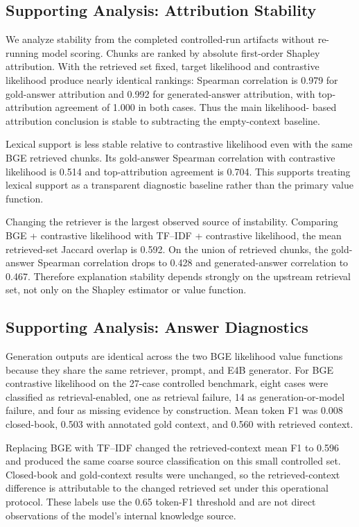 \documentclass[10pt]{article}
\begin{document}
\subsection{Supporting Analysis: Attribution Stability}
We analyze stability from the completed controlled-run artifacts without
re-running model scoring. Chunks are ranked by absolute first-order Shapley
attribution. With the retrieved set fixed, target likelihood and contrastive
likelihood produce nearly identical rankings: Spearman correlation is 0.979 for
gold-answer attribution and 0.992 for generated-answer attribution, with
top-attribution agreement of 1.000 in both cases. Thus the main likelihood-
based attribution conclusion is stable to subtracting the empty-context
baseline.

Lexical support is less stable relative to contrastive likelihood even with the
same BGE retrieved chunks. Its gold-answer Spearman correlation with
contrastive likelihood is 0.514 and top-attribution agreement is 0.704. This
supports treating lexical support as a transparent diagnostic baseline rather
than the primary value function.

Changing the retriever is the largest observed source of instability. Comparing
BGE + contrastive likelihood with TF--IDF + contrastive likelihood, the mean
retrieved-set Jaccard overlap is 0.592. On the union of retrieved chunks, the
gold-answer Spearman correlation drops to 0.428 and generated-answer
correlation to 0.467. Therefore explanation stability depends strongly on the
upstream retrieval set, not only on the Shapley estimator or value function.

\subsection{Supporting Analysis: Answer Diagnostics}
Generation outputs are identical across the two BGE likelihood value
functions because they share the same retriever, prompt, and E4B generator.
For BGE contrastive likelihood on the 27-case controlled benchmark, eight cases
were classified as retrieval-enabled, one as retrieval failure, 14 as
generation-or-model failure, and four as missing evidence by construction. Mean
token F1 was 0.008 closed-book, 0.503 with annotated gold context, and 0.560
with retrieved context.

Replacing BGE with TF--IDF changed the retrieved-context mean F1 to 0.596 and
produced the same coarse source classification on this small controlled set.
Closed-book and gold-context results were unchanged, so the retrieved-context
difference is attributable to the changed retrieved set under this operational
protocol.
These labels use the 0.65 token-F1 threshold and are not direct observations
of the model's internal knowledge source.
\end{document}
